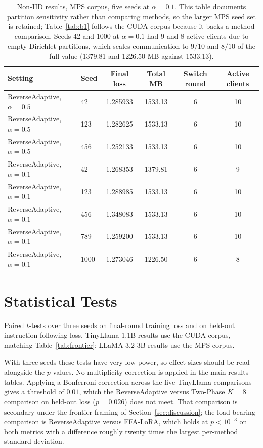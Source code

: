 \begin{table}[H]
\caption{Non-IID results, MPS corpus, five seeds at $\alpha{=}0.1$. This table documents partition sensitivity rather than comparing methods, so the larger MPS seed set is retained; Table~\ref{tab:b1} follows the CUDA corpus because it backs a method comparison. Seeds 42 and 1000 at $\alpha{=}0.1$ had 9 and 8 active clients due to empty Dirichlet partitions, which scales communication to $9/10$ and $8/10$ of the full value (1379.81 and 1226.50 MB against 1533.13).}
\label{tab:b2}
\begin{center}
\footnotesize
\setlength{\tabcolsep}{3pt}
\begin{tabular}{llcccc}
\toprule
Setting & Seed & Final loss & Total MB & Switch round & Active clients \\
\midrule
ReverseAdaptive, $\alpha{=}0.5$ & 42 & 1.285933 & 1533.13 & 6 & 10 \\
ReverseAdaptive, $\alpha{=}0.5$ & 123 & 1.282625 & 1533.13 & 6 & 10 \\
ReverseAdaptive, $\alpha{=}0.5$ & 456 & 1.252133 & 1533.13 & 6 & 10 \\
ReverseAdaptive, $\alpha{=}0.1$ & 42 & 1.268353 & 1379.81 & 6 & 9 \\
ReverseAdaptive, $\alpha{=}0.1$ & 123 & 1.288985 & 1533.13 & 6 & 10 \\
ReverseAdaptive, $\alpha{=}0.1$ & 456 & 1.348083 & 1533.13 & 6 & 10 \\
ReverseAdaptive, $\alpha{=}0.1$ & 789 & 1.259200 & 1533.13 & 6 & 10 \\
ReverseAdaptive, $\alpha{=}0.1$ & 1000 & 1.273046 & 1226.50 & 6 & 8 \\
\bottomrule
\end{tabular}
\end{center}
\end{table}

\section{Statistical Tests}
\label{app:stats}
Paired $t$-tests over three seeds on final-round training loss and on held-out instruction-following loss. TinyLlama-1.1B results use the CUDA corpus, matching Table~\ref{tab:frontier}; LLaMA-3.2-3B results use the MPS corpus.

With three seeds these tests have very low power, so effect sizes should be read alongside the $p$-values. No multiplicity correction is applied in the main results tables. Applying a Bonferroni correction across the five TinyLlama comparisons gives a threshold of $0.01$, which the ReverseAdaptive versus Two-Phase $K{=}8$ comparison on held-out loss ($p = 0.026$) does not meet. That comparison is secondary under the frontier framing of Section~\ref{sec:discussion}; the load-bearing comparison is ReverseAdaptive versus FFA-LoRA, which holds at $p < 10^{-3}$ on both metrics with a difference roughly twenty times the largest per-method standard deviation.

